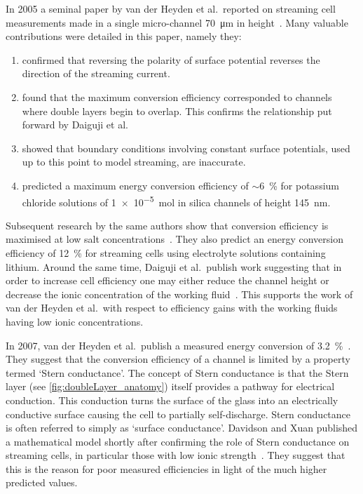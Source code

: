     In 2005 a seminal paper by van der Heyden et al.\ reported on streaming cell measurements made in a single micro-channel \SI{70}{\micro\meter} in height~\cite{VanderHeyden2005}.
    Many valuable contributions were detailed in this paper, namely they:
    \begin{enumerate}
      \item confirmed that reversing the polarity of surface potential reverses the direction of the streaming current.
      \item found that the maximum conversion efficiency corresponded to channels where double layers begin to overlap. This confirms the relationship put forward by Daiguji et al.\ ~\cite{Daiguji2004}
      \item showed that boundary conditions involving constant surface potentials, used up to this point to model streaming, are inaccurate.
      \item predicted a maximum energy conversion efficiency of $\sim$\SI{6}{\percent} for potassium chloride solutions of \SI{1e-5}{\mole} in silica channels of height \SI{145}{\nano\meter}.
    \end{enumerate}
    Subsequent research by the same authors show that conversion efficiency is maximised at low salt concentrations~\cite{VanderHeyden2006}.
    They also predict an energy conversion efficiency of \SI{12}{\percent} for streaming cells using electrolyte solutions containing lithium.
    Around the same time, Daiguji et al.\ publish work suggesting that in order to increase cell efficiency one may either reduce the channel height or decrease the ionic concentration of the working fluid~\cite{Daiguji2006}.
    This supports the work of van der Heyden et al.\ with respect to efficiency gains with the working fluids having low ionic concentrations.

    In 2007, van der Heyden et al.\ publish a measured energy conversion of \SI{3.2}{\percent}~\cite{Heyden2007}.
    They suggest that the conversion efficiency of a channel is limited by a property termed `Stern conductance'.
    The concept of Stern conductance is that the Stern layer (see \cref{fig:doubleLayer_anatomy}) itself provides a pathway for electrical conduction.
    This conduction turns the surface of the glass into an electrically conductive surface causing the cell to partially self-discharge.
    Stern conductance is often referred to simply as `surface conductance'.
    Davidson and Xuan published a mathematical model shortly after confirming the role of Stern conductance on streaming cells, in particular those with low ionic strength~\cite{Davidson2008}.
    They suggest that this is the reason for poor measured efficiencies in light of the much higher predicted values.

